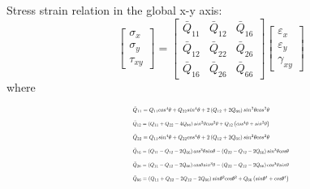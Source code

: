 Stress strain relation in the global x-y axis:
\begin{equation}
	\label{equ:stress-strain}
	\left[\begin{array}{l}
			\sigma _{x} \\ \sigma _{y} \\
			\tau_{xy}\end{array}\right]=\left[\begin{array}{lll}\bar{Q}_{11} &
			\bar{Q}_{12} & \bar{Q}_{16}\\ 
			\bar{Q}_{12} & \bar{Q}_{22} & \bar{Q}_{26} \\
								\bar{Q}_{16} & \bar{Q}_{26}
			 &\bar{Q}_{66}\end{array}\right]\left[\begin{array}{l}\varepsilon_{x}
	 \\ \varepsilon_{y}\\ \gamma_{x y}\end{array}\right] \end{equation}
where
\begin{equation}
	\begin{array}{l}
		\resizebox{.35\textwidth}{!}{$\bar{Q}_{11}=Q_{11} cos^{4}\theta+Q_{22} sin^{4}\theta+2\left(Q_{12}+2
		Q_{66}\right) sin^{2}\theta cos^{2}\theta$} \\

		\resizebox{.35\textwidth}{!}{$\bar{Q}_{12}=\left(Q_{11}+Q_{22}-4 Q_{66}\right) sin^{2}\theta
		cos^{2}\theta+Q_{12}\left(cos^{4}\theta+sin^{2}\theta \right)$} \\

		\resizebox{.35\textwidth}{!}{$\bar{Q}_{22}=Q_{11} sin^{4}\theta+Q_{22} cos^{4}\theta+2\left(Q_{12}+2
		Q_{66}\right) sin^{2}\theta cos^{2}\theta$} \\

		\resizebox{.4\textwidth}{!}{$\bar{Q}_{16}=\left(Q_{11}-Q_{12}-2
		Q_{66}\right) cos^{3}\theta sin\theta-\left(Q_{22}-Q_{12}-2Q_{66}\right)
	sin^{3}\theta cos\theta$} \\ 
		\resizebox{.4\textwidth}{!}{$\bar{Q}_{26}=\left(Q_{11}-Q_{12}-2
		Q_{66}\right) cos\theta sin^{3}\theta-\left(Q_{22}-Q_{12}-2
Q_{66}\right)cos^{3}\theta sin\theta$}
		 \\ 
	\resizebox{.4\textwidth}{!}	{$\bar{Q}_{66}=\left(Q_{11}+Q_{22}-2 Q_{12}-2 Q_{66}\right)
	sin\theta^{2}cos\theta^{2}+Q_{66}\left(sin\theta^{4}+cos\theta^{4}\right)$}\\
	\end{array}
\end{equation}



